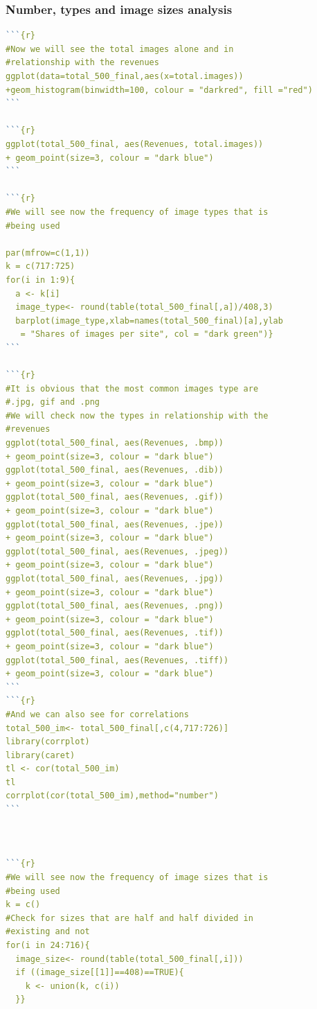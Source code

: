 \documentclass{book}
\begin{document}
\subsubsection{Number, types and image sizes analysis}\label{r: van: img}
\begin{lstlisting}[language=R]  
```{r}
#Now we will see the total images alone and in 
#relationship with the revenues
ggplot(data=total_500_final,aes(x=total.images))
+geom_histogram(binwidth=100, colour = "darkred", fill ="red")
```

```{r}
ggplot(total_500_final, aes(Revenues, total.images)) 
+ geom_point(size=3, colour = "dark blue")
```

```{r}
#We will see now the frequency of image types that is 
#being used

par(mfrow=c(1,1))
k = c(717:725)
for(i in 1:9){
  a <- k[i]
  image_type<- round(table(total_500_final[,a])/408,3)
  barplot(image_type,xlab=names(total_500_final)[a],ylab
   = "Shares of images per site", col = "dark green")}
```

```{r}
#It is obvious that the most common images type are 
#.jpg, gif and .png
#We will check now the types in relationship with the 
#revenues
ggplot(total_500_final, aes(Revenues, .bmp)) 
+ geom_point(size=3, colour = "dark blue")
ggplot(total_500_final, aes(Revenues, .dib)) 
+ geom_point(size=3, colour = "dark blue")
ggplot(total_500_final, aes(Revenues, .gif)) 
+ geom_point(size=3, colour = "dark blue")
ggplot(total_500_final, aes(Revenues, .jpe)) 
+ geom_point(size=3, colour = "dark blue")
ggplot(total_500_final, aes(Revenues, .jpeg)) 
+ geom_point(size=3, colour = "dark blue")
ggplot(total_500_final, aes(Revenues, .jpg)) 
+ geom_point(size=3, colour = "dark blue")
ggplot(total_500_final, aes(Revenues, .png)) 
+ geom_point(size=3, colour = "dark blue")
ggplot(total_500_final, aes(Revenues, .tif)) 
+ geom_point(size=3, colour = "dark blue")
ggplot(total_500_final, aes(Revenues, .tiff)) 
+ geom_point(size=3, colour = "dark blue")
```
```{r}
#And we can also see for correlations
total_500_im<- total_500_final[,c(4,717:726)]
library(corrplot)
library(caret)
tl <- cor(total_500_im)
tl
corrplot(cor(total_500_im),method="number")
```



```{r}
#We will see now the frequency of image sizes that is 
#being used
k = c()
#Check for sizes that are half and half divided in 
#existing and not
for(i in 24:716){
  image_size<- round(table(total_500_final[,i]))
  if ((image_size[[1]]==408)==TRUE){
    k <- union(k, c(i))
  }}


\end{lstlisting}
\end{document}
